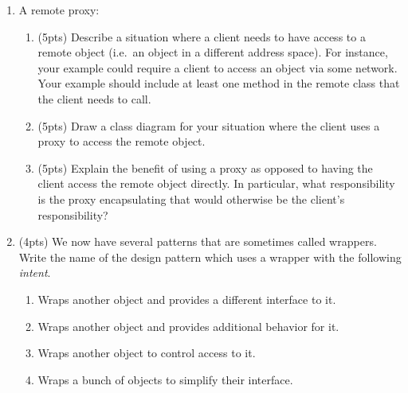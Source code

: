\documentclass[11pt]{article}
\begin{document}
\begin{enumerate}
\begin{enumerate}
  \end{enumerate}

\newpage

  \item A remote proxy:

  \begin{enumerate}

    \item (5pts) Describe a situation where a client needs to have access to a remote object (i.e.~an object in a different address space). For instance, your example could require a client to access an object via some network. Your example should include at least one method in the remote class that the client needs to call. 

    \vfill

    \item (5pts) Draw a class diagram for your situation where the client uses a proxy to access the remote object.

    \vfill

    \item (5pts) Explain the benefit of using a proxy as opposed to having the client access the remote object directly. In particular, what responsibility is the proxy encapsulating that would otherwise be the client's responsibility? 

    \vfill

  \end{enumerate}


  \item (4pts) We now have several patterns that are sometimes called wrappers. 
   Write the name of the design pattern which uses a wrapper with the following \emph{intent}.

  \begin{enumerate}

    \item Wraps another object and provides a different interface to it.

    \bigskip

    \item Wraps another object and provides additional behavior for it.

    \bigskip

    \item Wraps another object to control access to it.

    \bigskip

    \item Wraps a bunch of objects to simplify their interface. 

    \bigskip

  \end{enumerate}



\end{enumerate}
\end{document}
